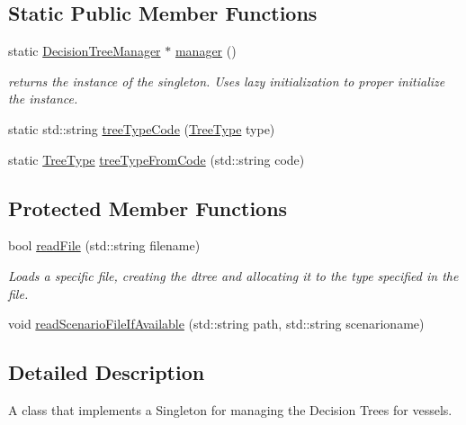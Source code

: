 \subsection*{Static Public Member Functions}
\begin{DoxyCompactItemize}
\item 
static \mbox{\hyperlink{classdtree_1_1_decision_tree_manager}{Decision\+Tree\+Manager}} $\ast$ \mbox{\hyperlink{classdtree_1_1_decision_tree_manager_a35ea592ac00794339323dcc295f63b0c}{manager}} ()
\begin{DoxyCompactList}\small\item\em returns the instance of the singleton. Uses lazy initialization to proper initialize the instance. \end{DoxyCompactList}\item 
static std\+::string \mbox{\hyperlink{classdtree_1_1_decision_tree_manager_a18ebb2b8fb040aec991a99c802ea29af}{tree\+Type\+Code}} (\mbox{\hyperlink{classdtree_1_1_decision_tree_manager_a14180eb59d2c245ce3af1c27ddb0846d}{Tree\+Type}} type)
\item 
static \mbox{\hyperlink{classdtree_1_1_decision_tree_manager_a14180eb59d2c245ce3af1c27ddb0846d}{Tree\+Type}} \mbox{\hyperlink{classdtree_1_1_decision_tree_manager_aba3d26531d22ef36993e535ec0bf9b26}{tree\+Type\+From\+Code}} (std\+::string code)
\end{DoxyCompactItemize}
\subsection*{Protected Member Functions}
\begin{DoxyCompactItemize}
\item 
bool \mbox{\hyperlink{classdtree_1_1_decision_tree_manager_a5ae8a7074f148056d13051c484974bf6}{read\+File}} (std\+::string filename)
\begin{DoxyCompactList}\small\item\em Loads a specific file, creating the dtree and allocating it to the type specified in the file. \end{DoxyCompactList}\item 
void \mbox{\hyperlink{classdtree_1_1_decision_tree_manager_ae1c3dba103715e7d3c8a20cff575efd8}{read\+Scenario\+File\+If\+Available}} (std\+::string path, std\+::string scenarioname)
\end{DoxyCompactItemize}


\subsection{Detailed Description}
A class that implements a Singleton for managing the Decision Trees for vessels. 



